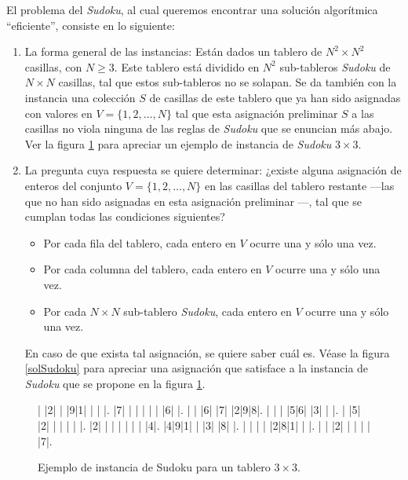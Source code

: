 \documentclass[12pt,lettersize,oneside]{article}
\begin{document}
El problema del \emph{Sudoku}, al cual queremos encontrar una solución
algorítmica ``eficiente'', consiste en lo siguiente:\vspace{-2.5mm}
\begin{enumerate}
\item La forma general de las instancias: Están dados un tablero de $N^2 \times
  N^2$ casillas, con $N\geq 3$. Este tablero está dividido en $N^2$ sub-tableros
  \emph{Sudoku} de $N \times N$ casillas, tal que estos sub-tableros no se
  solapan. Se da también con la instancia una colección $S$ de casillas de este
  tablero que ya han sido asignadas con valores en $V=\{1,2,\ldots,N\}$ tal que
  esta asignación preliminar $S$ a las casillas no viola ninguna de las reglas
  de \emph{Sudoku} que se enuncian más abajo. Ver la figura
  \ref{instanciaSudoku} para apreciar un ejemplo de instancia de \emph{Sudoku}
  $3 \times 3$.

  \item La pregunta cuya respuesta se quiere determinar: ¿existe alguna
    asignación de enteros del conjunto $V=\{1,2,\ldots,N\}$ en las casillas del
    tablero restante ---las que no han sido asignadas en esta asignación
    preliminar ---, tal que se cumplan todas las condiciones siguientes?
    \begin{itemize}
    \item Por cada fila del tablero, cada entero en $V$ ocurre una y sólo una
      vez.
    \item Por cada columna del tablero, cada entero en $V$ ocurre una y sólo una
      vez.
    \item Por cada $N \times N$ sub-tablero \emph{Sudoku}, cada entero en $V$
      ocurre una y sólo una vez.
    \end{itemize}
    En caso de que exista tal asignación, se quiere saber cuál es. Véase la
    figura \ref{solSudoku} para apreciar una asignación que satisface a la
    instancia de \emph{Sudoku} que se propone en la figura
    \ref{instanciaSudoku}. 
\end{enumerate}
\begin{figure}\caption{Ejemplo de instancia de Sudoku para un tablero $3 \times 3$.}
\label{instanciaSudoku}
\setlength\sudokusize{6.5cm}
\begin{sudoku}
| |2| | |9|1| | | |.
|7| | | | | | |6| |.
| | |6| |7| |2|9|8|.
| | | |5|6| |3| | |.
| |5| |2| | | | | |.
|2| | | | | | | |4|.
|4|9|1| | |3| |8| |.
| | | | |2|8|1| | |.
| | |2| | | | | |7|.
\end{sudoku}
\end{figure}
\end{document}
